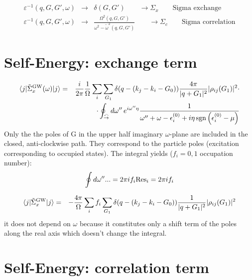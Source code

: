 \documentclass[fleqn]{article}
\begin{document}
\begin{eqnarray*}
\varepsilon^{-1}(q,G,G',\omega) &\rightarrow& \delta(G,G') 
  \qquad \rightarrow \Sigma_x \qquad \textrm{Sigma exchange} \\
  \varepsilon^{-1}(q,G,G',\omega) &\rightarrow& 
  \frac{\Omega^2(q,G,G')}{\omega^2 - \tilde{\omega}^2(q,G,G')}
  \qquad \rightarrow \Sigma_c \qquad \textrm{Sigma correlation}
\end{eqnarray*}

\section{Self-Energy: exchange term}

\begin{eqnarray*}
\langle j | \tilde{\Sigma}^{\rm GW}_{x}(\omega) | j \rangle
&=&  \frac{i}{2 \pi} \frac{1}{\Omega} \sum_i \sum_{G_1} \delta(q-(k_j - k_i - G_0))
   \frac{4\pi}{|q+G_1|^2}
  | \rho_{ij}(G_1)|^2  \cdot \\ && \cdot
  \oint_{{\overset{\curvearrowleft}{\rightarrow}}} d\omega'' \, e^{i \omega'' \eta} 
   \frac{1}{\omega'' + \omega - \epsilon^{(0)}_i + i \eta \mathrm{\, sgn} \left( \epsilon^{(0)}_i - \mu \right)} 
\end{eqnarray*}
Only the the poles of G in the upper half imaginary $\omega$-plane are included
in the closed, anti-clockwise path. They correspond to the particle poles
(excitation corresponding to occupied states).
The integral yields ($f_i=0,1$ occupation number):
\[
\oint d\omega'' ... = 2 \pi i f_i {\rm Res}_i = 2 \pi i f_i
\]

\begin{eqnarray*}
\langle j | \tilde{\Sigma}^{\rm GW}_{x} | j \rangle
&=&  - \frac{4 \pi}{\Omega} \sum_i f_i \sum_{G_1} \delta(q-(k_j - k_i - G_0))
   \frac{1}{|q+G_1|^2}
  | \rho_{ij}(G_1) |^2
\end{eqnarray*}
it does not depend on $\omega$ because it constitutes only a shift
term of the poles along the real axis which doesn't change the integral.

\newpage

\section{Self-Energy: correlation term}
\end{document}
